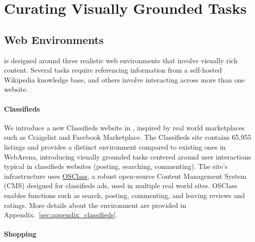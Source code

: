 \section{Curating Visually Grounded Tasks}


\subsection{Web Environments}
\BenchmarkName{} is designed around three realistic web environments that involve visually rich content. Several tasks require referencing information from a self-hosted Wikipedia knowledge base, and others involve interacting across more than one website.%


\paragraph{Classifieds}
We introduce a new Classifieds website in \BenchmarkName{}, inspired by real world marketplaces such as Craigslist and Facebook Marketplace. The Classifieds site contains 65,955 listings and provides a distinct environment compared to existing ones in WebArena, introducing visually grounded tasks centered around user interactions typical in classifieds websites (posting, searching, commenting). The site's infrastructure uses \href{https://osclass-classifieds.com}{OSClass}, a robust open-source Content Management System (CMS) designed for classifieds ads, used in multiple real world sites. OSClass enables functions such as search, posting, commenting, and leaving reviews and ratings. More details about the environment are provided in Appendix.~\ref{sec:appendix_classifieds}. %


\paragraph{Shopping}

